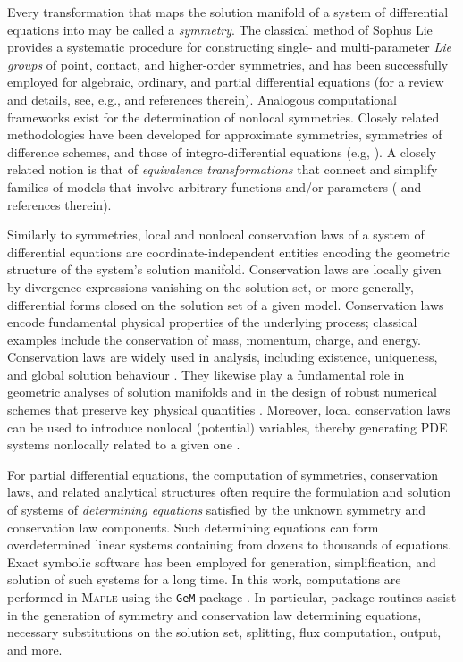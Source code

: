\documentclass[alpha-refs, 12pt]{wiley-article}
\begin{document}
Every transformation that maps the solution manifold of a system of differential equations into may be called a \emph{symmetry}. The classical method of Sophus Lie provides a systematic procedure for constructing single- and multi-parameter \emph{Lie groups} of point, contact, and higher-order symmetries, and has been successfully employed for algebraic, ordinary, and partial differential equations (for a review and details, see, e.g., \citet{olver2000applications, Bluman2010} and references therein). Analogous computational frameworks exist for the determination of nonlocal symmetries. Closely related methodologies have been developed for approximate symmetries, symmetries of difference schemes, and those of integro-differential equations (e.g, \cite{Ibragimov1995, dorodnitsyn2010applications, tarayrah2023two, druzhkov2024relationship}). A closely related notion is that of \emph{equivalence transformations} that connect and simplify families of models that involve arbitrary functions and/or parameters (\citet{cheviakov2017symbolic} and references therein).

Similarly to symmetries, local and nonlocal conservation laws of a system of differential equations are coordinate-independent entities encoding the geometric structure of the system's solution manifold. Conservation laws are locally given by divergence expressions vanishing on the solution set, or more generally, differential forms closed on the solution set of a given model. Conservation laws encode fundamental physical properties of the underlying process; classical examples include the conservation of mass, momentum, charge, and energy. Conservation laws are widely used in analysis, including existence, uniqueness, and global solution behaviour \citep{Lax1968, Olver1993, Evans2010, Knops1984, cheviakov2024analytical}. They likewise play a fundamental role in geometric analyses of solution manifolds and in the design of robust numerical schemes that preserve key physical quantities \citep{LeVeque2002, cheviakov2020invariant}. Moreover, local conservation laws can be used to introduce nonlocal (potential) variables, thereby generating PDE systems nonlocally related to a given one \citep{Bluman1987, Sjoberg2004, Bluman2010}.

For partial differential equations, the computation of symmetries, conservation laws, and related analytical structures often require the formulation and solution of systems of \emph{determining equations} satisfied by the unknown symmetry and conservation law components. Such determining equations can form overdetermined linear systems containing from dozens to thousands of equations. Exact symbolic software has been employed for generation, simplification, and solution of such systems for a long time. In this work, computations are performed in \textsc{Maple} using the \texttt{GeM} package \citep{Cheviakov2007, cheviakov2010computation, cheviakov2010symbolic, cheviakov2017symbolic, GeMpage}. In particular, package routines assist in the generation of symmetry and conservation law determining equations, necessary substitutions on the solution set, splitting, flux computation, output, and more.
\end{document}
